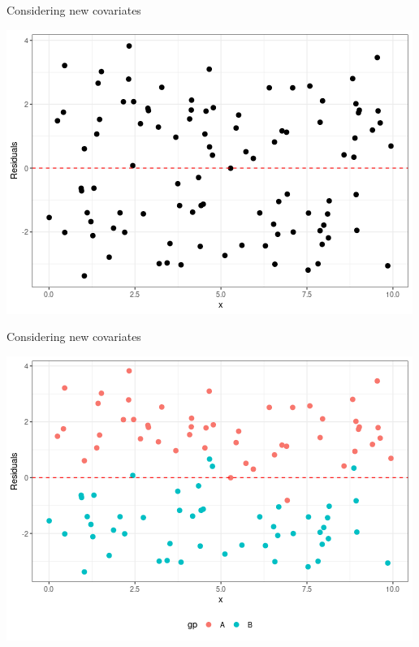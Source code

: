 \documentclass{beamer}
\begin{document}
\begin{frame}{Considering new covariates}
\begin{center}
\includegraphics[scale=0.5]{miss_cat_res.png}
\end{center}
\end{frame}


\begin{frame}{Considering new covariates}
\begin{center}
\includegraphics[scale=0.5]{miss_cat_res2.png}
\end{center}
\end{frame}
\end{document}
